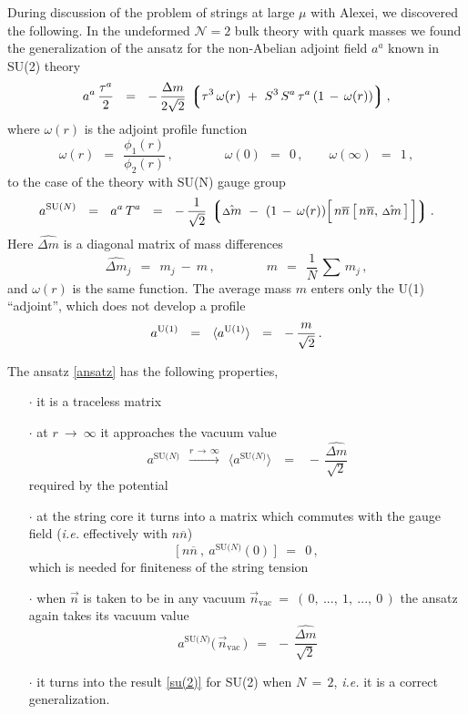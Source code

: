 \documentclass[12pt]{article}
\def\beq{\begin{equation}}
\def\eeq{\end{equation}}
\newcommand{\ntwo}{${\mathcal N}=2$ }
\newcommand{\ov}{\overline}
\newcommand{\lgr}{\left\lgroup}
\newcommand{\rgr}{\right\rgroup}
\newcommand{\aU}{a^{\rm U(1)}}
\newcommand{\aN}{a^\text{SU($N$)}}
\newcommand{\nnbar}{n\ov{n}}
\newcommand{\dm}{\hat{{\scriptstyle \Delta} m}}
\newcommand{\ie}{{\it i.e.} }
\begin{document}
	During discussion of the problem of strings at large $ \mu $ with Alexei, we discovered the following.
	In the undeformed \ntwo bulk theory with quark masses we found the generalization of the
	ansatz for the non-Abelian adjoint field $ a^a $ known in SU(2) theory
\beq
\label{su(2)}
	a^a\, \frac{\tau^a}{2}    ~~=~~    -\, \frac{\Delta m}{2\sqrt{2}}\, 
		\lgr  \tau^3\, \omega(r)  ~+~  S^3\, S^a\,\tau^a\, (1 \,-\, \omega(r))  \rgr,
\eeq
	where $ \omega(r) $ is the adjoint profile function 
\beq
\label{omega}
	\omega(r)    ~~=~~    \frac{\phi_1(r)}{\phi_2(r)}\,,
	\qquad\qquad
	\omega(0)    ~~=~~    0\,,
	\qquad
	\omega(\infty)    ~~=~~    1\,,
\eeq
	to the case of the theory with SU(N) gauge group
\beq
\label{ansatz}
	\aN    ~~=~~    a^a\, T^a    ~~=~~
	-\, \frac{1}{\sqrt{2}}\, 
	\lgr \dm  ~-~  (1 \,-\, \omega(r)) \Big[\, \nnbar\, \big[\, \nnbar,\, \dm \,\big] \,\Big] \rgr.
\eeq
	Here $ \dm $ is a diagonal matrix of mass differences
\beq
	\dm{}_j    ~~=~~    m_j  ~-~  m\,,
	\qquad\qquad
	m    ~~=~~    \frac{1}{N}\,\sum\, m_j\,,
\eeq
	and $ \omega(r) $ is the same function.
	The average mass $ m $ enters only the U(1) ``adjoint'', which does not develop a profile
\beq
	\aU    ~~=~~    \langle \aU \rangle    ~~=~~  -\,\frac{m}{\sqrt{2}}\,.
\eeq

	The ansatz \eqref{ansatz} has the following properties,
\begin{itemize}
\item[$\cdot$]
	it is a traceless matrix

\item[$\cdot$]
	at $ r ~\longrightarrow~ \infty $ it approaches the vacuum value 
\beq
	\aN    ~~\overset{r\,\to\,\infty}{\longrightarrow}~~    
	\langle \aN \rangle    \;~~=~~\;    -\, \frac{\dm}{\sqrt{2}}
\eeq
	required by the potential


\item[$\cdot$]    
	at the string core it turns into a matrix which commutes with the gauge field (\ie effectively with $ \nnbar $)
\[
	\big[~ \nnbar ~,~ \aN(0) ~\big]    ~~=~~    0\,,
\]
	which is needed for finiteness of the string tension


\item[$\cdot$]  
	when $ \vec{n} $ is taken to be in any vacuum $ \vec{n}_\text{vac} ~=~  (\, 0,~ ...,~ 1,~ ...,~ 0 \,) $
	the ansatz again takes its vacuum value
\beq
\label{aNvac}
	\aN \big(\, \vec{n}_\text{vac} \,\big)    ~~=~~    -\, \frac{\dm}{\sqrt{2}}
\eeq


\item[$\cdot$]    
	it turns into the result \eqref{su(2)} for SU(2) when $ N \,=\, 2 $, \ie it is a correct generalization.

\end{itemize}
\end{document}
